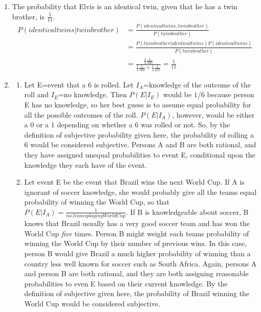 \documentclass[12pt]{article}\usepackage[]{graphicx}\usepackage[]{color}
\begin{document}
\begin{doublespacing}
\begin{enumerate}
\begin{enumerate}
\end{enumerate}

\item The probability that Elvis is an identical twin, given that he has a twin brother, is $\frac{5}{11}$.
\begin{align*}
P(identical twins|twin brother) &= \frac{P(identical twins, twin brother)}
{P(twin brother)} \\
&= \frac{P(twin brother| identical twins)P(identical twins)}{P(twin brother)}\\
&= \frac{\frac{1}{2}\frac{1}{300}}{\frac{1}{2}\frac{1}{300}+\frac{1}{4}\frac{1}{225}}
= \frac{5}{11}
\end{align*}

\item \begin{enumerate}

\item Let E=event that a $6$ is rolled. Let $I_A$=knowledge of the outcome of the roll and $I_E$=no knowledge. Then $P(E|I_E)$ would be $1/6$ because person E has no knowledge, so her best guess is to assume equal probability for all the possible outcomes of the roll. $P(E|I_A)$, however, would be either a $0$ or a $1$ depending on whether a $6$ was rolled or not. So, by the definition of subjective probability given here, the probability of rolling a $6$ would be considered subjective. Persons A and B are both rational, and they have assigned unequal probabilities to event E, conditional upon the knowledge they each have of the event. 

\item Let event E be the event that Brazil wins the next World Cup. If A is ignorant of soccer knowledge, she would probably give all the teams equal probability of winning the World Cup, so that $P(E|I_A)=\frac{1}{no.teams playing World Cup}$. If B is knowledgeable about soccer, B knows that Brazil usually has a very good soccer team and has won the World Cup {\it five} times. Person B might weight each teams probability of winning the World Cup by their number of previous wins. In this case, person B would give Brazil a much higher probability of winning than a country less well known for soccer such as South Africa. Again, persons A and person B are both rational, and they are both assigning reasonable probabilities to even E based on their current knowledge. By the definition of subjective given here, the probability of Brazil winning the World Cup would be considered subjective. 


\end{enumerate}
\end{enumerate}
\end{doublespacing}
\end{document}
